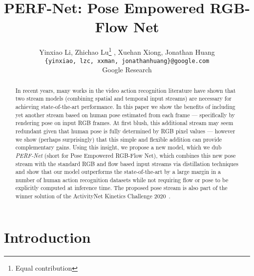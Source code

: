 \documentclass[10pt,twocolumn,letterpaper]{article}
\begin{document}
\title{PERF-Net: Pose Empowered RGB-Flow Net}




\author{
Yinxiao Li, Zhichao Lu\thanks{Equal contribution} , Xuehan Xiong, Jonathan Huang \\
{\tt\small  {\{yinxiao, lzc, xxman, jonathanhuang\}@google.com}} \\
Google Research \\
}

\maketitle

\ifwacvfinal
\thispagestyle{empty}

\begin{abstract}





In recent years, many works in the video action recognition literature have shown that two stream models (combining spatial and temporal input streams) are necessary for achieving state-of-the-art performance. In this paper we show the benefits of including yet another stream based on human pose estimated from each frame --- specifically by rendering pose on input RGB frames. At first blush, this additional stream may seem redundant given that human pose is fully determined by RGB pixel values --- however we show (perhaps surprisingly) that this simple and flexible addition can provide complementary gains. Using this insight, we propose a new model, which we dub \emph{PERF-Net} (short for Pose Empowered RGB-Flow Net), which combines this new pose stream with the standard RGB and flow based input streams via distillation techniques and show that our model outperforms the state-of-the-art by a large margin in a number of human action recognition datasets while not requiring flow or pose to be explicitly computed at inference time. The proposed pose stream is also part of the winner solution of the ActivityNet Kinetics Challenge 2020~\cite{activitynet2020}.

\vspace{-0.5cm}
\end{abstract}


\section{Introduction}\label{sec:intro}
\end{document}
